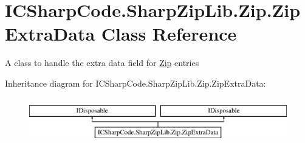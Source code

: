 \hypertarget{class_i_c_sharp_code_1_1_sharp_zip_lib_1_1_zip_1_1_zip_extra_data}{}\section{I\+C\+Sharp\+Code.\+Sharp\+Zip\+Lib.\+Zip.\+Zip\+Extra\+Data Class Reference}
\label{class_i_c_sharp_code_1_1_sharp_zip_lib_1_1_zip_1_1_zip_extra_data}


A class to handle the extra data field for \hyperlink{namespace_i_c_sharp_code_1_1_sharp_zip_lib_1_1_zip}{Zip} entries  


Inheritance diagram for I\+C\+Sharp\+Code.\+Sharp\+Zip\+Lib.\+Zip.\+Zip\+Extra\+Data\+:\begin{figure}[H]
\begin{center}
\leavevmode
\includegraphics[height=2.000000cm]{class_i_c_sharp_code_1_1_sharp_zip_lib_1_1_zip_1_1_zip_extra_data}
\end{center}
\end{figure}
